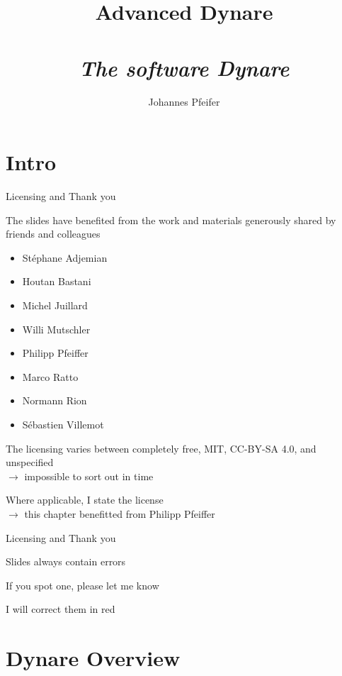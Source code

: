 \documentclass[handout,usepdftitle=false,xcolor=dvipsnames,aspectratio=169]{beamer}
\title[]{\textbf{Advanced Dynare\\}
\medskip{Chapter I}\\
\emph{The software Dynare}
}
\author{Johannes Pfeifer}
\begin{document}
\begin{frame}[plain]
  \titlepage
\end{frame}

\section{Intro}
\begin{frame}{Licensing and Thank you}
	\begin{witemize}
        \item The slides have benefited from the work and materials generously shared by friends and colleagues
        \begin{itemize}
          \item Stéphane Adjemian
          \item Houtan Bastani
          \item Michel Juillard
          \item Willi Mutschler
          \item Philipp Pfeiffer
          \item Marco Ratto
          \item Normann Rion
          \item Sébastien Villemot
        \end{itemize}
        \item The licensing varies between completely free, MIT, CC-BY-SA 4.0, and unspecified\\
        $\rightarrow$ impossible to sort out in time
        \item Where applicable, I state the license\\
        $\rightarrow$ this chapter benefitted from Philipp Pfeiffer
    \end{witemize}
\end{frame}


\begin{frame}{Licensing and Thank you}
	\begin{witemize}
        \item Slides always contain errors
        \item If you spot one, please let me know
        \item I will \alert{correct them in red}
    \end{witemize}
\end{frame}

\section{Dynare Overview}
\end{document}
